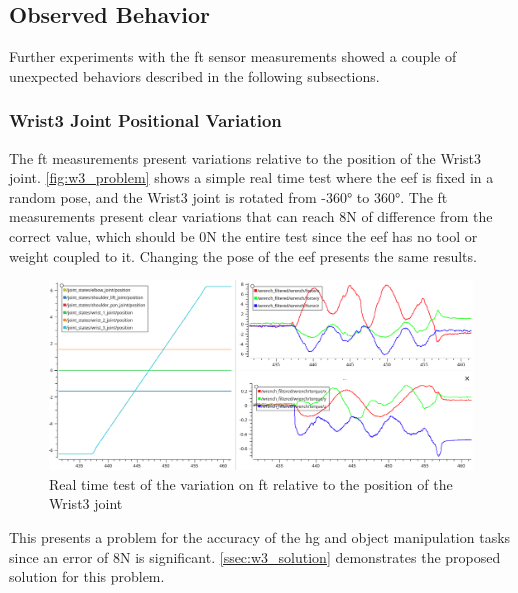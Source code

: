 \subsection{Observed Behavior}
\label{ssec:ft_sensor_behavior}

\par Further experiments with the \ac{ft} sensor measurements showed a couple of unexpected behaviors described in the following subsections.

\subsubsection{Wrist3 Joint Positional Variation}

\par The \ac{ft} measurements present variations relative to the position of the Wrist3 joint. \autoref{fig:w3_problem} shows a simple real time test where the \ac{eef} is fixed in a random pose, and the Wrist3 joint is rotated from \ang{-360} to \ang{360}. The \ac{ft} measurements present clear variations that can reach 8N of difference from the correct value, which should be 0N the entire test since the \ac{eef} has no tool or weight coupled to it. Changing the pose of the \ac{eef} presents the same results.

\begin{figure}[h]
    \centering
    \includegraphics[width=0.9\linewidth]{figs/chp3/wrist_3_problem.png}
    \caption{Real time test of the variation on \ac{ft} relative to the position of the Wrist3 joint}
    \label{fig:w3_problem}
\end{figure}

\par This presents a problem for the accuracy of the \ac{hg} and object manipulation tasks since an error of 8N is significant. \autoref{ssec:w3_solution} demonstrates the proposed solution for this problem.

